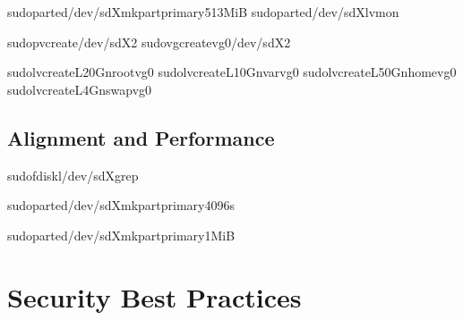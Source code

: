 \documentclass[letterpaper,10pt,english]{sphinxmanual}
\begin{document}
\begin{sphinxVerbatim}[commandchars=\\\{\}]
sudoparted/dev/sdXmkpartprimary513MiB\PYGZpc{}
sudoparted/dev/sdXlvmon

sudopvcreate/dev/sdX2
sudovgcreatevg0/dev/sdX2

sudolvcreate\PYGZhy{}L20G\PYGZhy{}nrootvg0
sudolvcreate\PYGZhy{}L10G\PYGZhy{}nvarvg0
sudolvcreate\PYGZhy{}L50G\PYGZhy{}nhomevg0
sudolvcreate\PYGZhy{}L4G\PYGZhy{}nswapvg0
\end{sphinxVerbatim}


\subsection{Alignment and Performance}
\label{\detokenize{best-practices:alignment-and-performance}}
\sphinxAtStartPar
{}

\begin{sphinxVerbatim}[commandchars=\\\{\}]
sudofdisk\PYGZhy{}l/dev/sdXgrep

sudoparted/dev/sdXmkpartprimary4096s\PYGZpc{}

sudoparted/dev/sdXmkpartprimary1MiB\PYGZpc{}
\end{sphinxVerbatim}


\section{Security Best Practices}
\label{\detokenize{best-practices:security-best-practices}}
\end{document}
